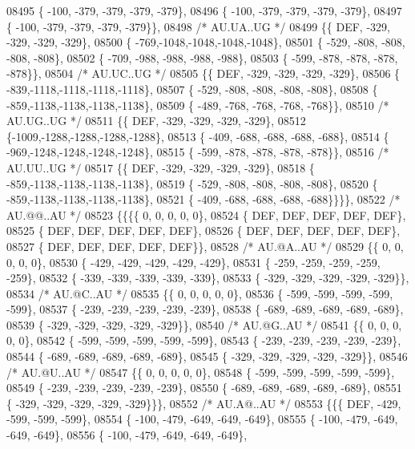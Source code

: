 \begin{DoxyCode}
08495 \{ -100, -379, -379, -379, -379\},
08496 \{ -100, -379, -379, -379, -379\},
08497 \{ -100, -379, -379, -379, -379\}\},
08498 \textcolor{comment}{/* AU.UA..UG */}
08499 \{\{  DEF, -329, -329, -329, -329\},
08500 \{ -769,-1048,-1048,-1048,-1048\},
08501 \{ -529, -808, -808, -808, -808\},
08502 \{ -709, -988, -988, -988, -988\},
08503 \{ -599, -878, -878, -878, -878\}\},
08504 \textcolor{comment}{/* AU.UC..UG */}
08505 \{\{  DEF, -329, -329, -329, -329\},
08506 \{ -839,-1118,-1118,-1118,-1118\},
08507 \{ -529, -808, -808, -808, -808\},
08508 \{ -859,-1138,-1138,-1138,-1138\},
08509 \{ -489, -768, -768, -768, -768\}\},
08510 \textcolor{comment}{/* AU.UG..UG */}
08511 \{\{  DEF, -329, -329, -329, -329\},
08512 \{-1009,-1288,-1288,-1288,-1288\},
08513 \{ -409, -688, -688, -688, -688\},
08514 \{ -969,-1248,-1248,-1248,-1248\},
08515 \{ -599, -878, -878, -878, -878\}\},
08516 \textcolor{comment}{/* AU.UU..UG */}
08517 \{\{  DEF, -329, -329, -329, -329\},
08518 \{ -859,-1138,-1138,-1138,-1138\},
08519 \{ -529, -808, -808, -808, -808\},
08520 \{ -859,-1138,-1138,-1138,-1138\},
08521 \{ -409, -688, -688, -688, -688\}\}\}\},
08522 \textcolor{comment}{/* AU.@@..AU */}
08523 \{\{\{\{    0,    0,    0,    0,    0\},
08524 \{  DEF,  DEF,  DEF,  DEF,  DEF\},
08525 \{  DEF,  DEF,  DEF,  DEF,  DEF\},
08526 \{  DEF,  DEF,  DEF,  DEF,  DEF\},
08527 \{  DEF,  DEF,  DEF,  DEF,  DEF\}\},
08528 \textcolor{comment}{/* AU.@A..AU */}
08529 \{\{    0,    0,    0,    0,    0\},
08530 \{ -429, -429, -429, -429, -429\},
08531 \{ -259, -259, -259, -259, -259\},
08532 \{ -339, -339, -339, -339, -339\},
08533 \{ -329, -329, -329, -329, -329\}\},
08534 \textcolor{comment}{/* AU.@C..AU */}
08535 \{\{    0,    0,    0,    0,    0\},
08536 \{ -599, -599, -599, -599, -599\},
08537 \{ -239, -239, -239, -239, -239\},
08538 \{ -689, -689, -689, -689, -689\},
08539 \{ -329, -329, -329, -329, -329\}\},
08540 \textcolor{comment}{/* AU.@G..AU */}
08541 \{\{    0,    0,    0,    0,    0\},
08542 \{ -599, -599, -599, -599, -599\},
08543 \{ -239, -239, -239, -239, -239\},
08544 \{ -689, -689, -689, -689, -689\},
08545 \{ -329, -329, -329, -329, -329\}\},
08546 \textcolor{comment}{/* AU.@U..AU */}
08547 \{\{    0,    0,    0,    0,    0\},
08548 \{ -599, -599, -599, -599, -599\},
08549 \{ -239, -239, -239, -239, -239\},
08550 \{ -689, -689, -689, -689, -689\},
08551 \{ -329, -329, -329, -329, -329\}\}\},
08552 \textcolor{comment}{/* AU.A@..AU */}
08553 \{\{\{  DEF, -429, -599, -599, -599\},
08554 \{ -100, -479, -649, -649, -649\},
08555 \{ -100, -479, -649, -649, -649\},
08556 \{ -100, -479, -649, -649, -649\},

\end{DoxyCode}
